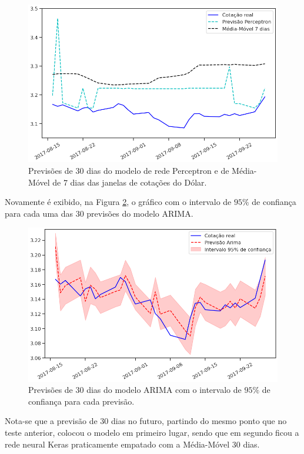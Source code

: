 \begin{figure}[htb]
\centering
\includegraphics[width=14cm]{figuras/series_previsoes_30_2}
\caption{Previsões de $30$ dias do modelo de rede Perceptron e de Média-Móvel de $7$ dias das janelas de cotações do Dólar.}
\label{fig:series_previsoes_30_2}
\end{figure}

Novamente é exibido, na Figura \ref{fig:series_previsoes_30_3}, o gráfico com o intervalo de $95\%$ de confiança para cada uma das $30$ previsões do modelo ARIMA.

\begin{figure}[htb]
\centering
\includegraphics[width=14cm]{figuras/series_previsoes_30_3}
\caption{Previsões de $30$ dias do modelo ARIMA com o intervalo de $95\%$ de confiança para cada previsão.}
\label{fig:series_previsoes_30_3}
\end{figure}

Nota-se que a previsão de $30$ dias no futuro, partindo do mesmo ponto que no teste anterior, colocou o modelo  em primeiro lugar, sendo que em segundo ficou a rede neural Keras praticamente empatado com a Média-Móvel $30$ dias.

